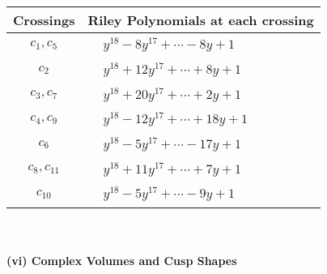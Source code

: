 \documentclass[1p]{elsarticle_modified}
\theoremstyle{definition}
\begin{document}
\begin{tabular}{m{50pt}|m{274pt}}
Crossings & \hspace{64pt}Riley Polynomials at each crossing \\
\hline $$\begin{aligned}c_{1},c_{5}\end{aligned}$$&$\begin{aligned}
&y^{18}-8 y^{17}+\cdots-8 y+1
\end{aligned}$\\
\hline $$\begin{aligned}c_{2}\end{aligned}$$&$\begin{aligned}
&y^{18}+12 y^{17}+\cdots+8 y+1
\end{aligned}$\\
\hline $$\begin{aligned}c_{3},c_{7}\end{aligned}$$&$\begin{aligned}
&y^{18}+20 y^{17}+\cdots+2 y+1
\end{aligned}$\\
\hline $$\begin{aligned}c_{4},c_{9}\end{aligned}$$&$\begin{aligned}
&y^{18}-12 y^{17}+\cdots+18 y+1
\end{aligned}$\\
\hline $$\begin{aligned}c_{6}\end{aligned}$$&$\begin{aligned}
&y^{18}-5 y^{17}+\cdots-17 y+1
\end{aligned}$\\
\hline $$\begin{aligned}c_{8},c_{11}\end{aligned}$$&$\begin{aligned}
&y^{18}+11 y^{17}+\cdots+7 y+1
\end{aligned}$\\
\hline $$\begin{aligned}c_{10}\end{aligned}$$&$\begin{aligned}
&y^{18}-5 y^{17}+\cdots-9 y+1
\end{aligned}$\\
\hline
\end{tabular}\\~\\
\newpage\flushleft \textbf{(vi) Complex Volumes and Cusp Shapes}
\end{document}
